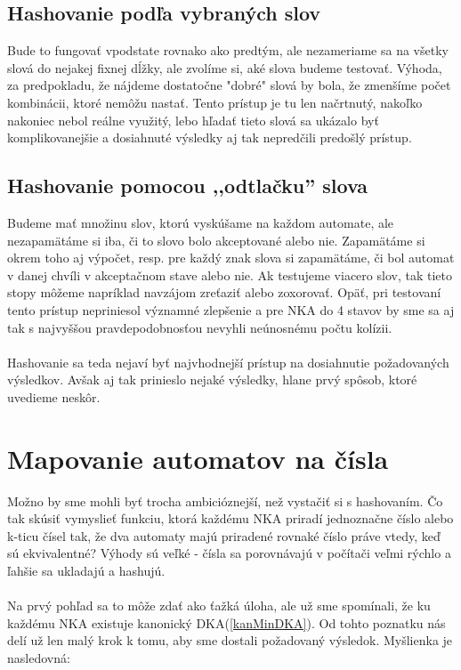\subsection{Hashovanie podľa vybraných slov}
Bude to fungovať vpodstate rovnako ako predtým, ale nezameriame sa na všetky slová do nejakej fixnej dĺžky, ale zvolíme si, aké slova budeme testovať. Výhoda, za predpokladu, že nájdeme dostatočne "dobré" slová by bola, že zmenšíme počet kombinácii, ktoré nemôžu nastať. Tento prístup je tu len načrtnutý, nakoľko nakoniec nebol reálne využitý, lebo hľadať tieto slová sa ukázalo byť komplikovanejšie a dosiahnuté výsledky aj tak nepredčili predošlý prístup.

\subsection{Hashovanie pomocou ,,odtlačku'' slova}
Budeme mať množinu slov, ktorú vyskúšame na každom automate, ale nezapamätáme si iba, či to slovo bolo akceptované alebo nie. Zapamätáme si okrem toho aj výpočet, resp. pre každý znak slova si zapamätáme, či bol automat v danej chvíli v akceptačnom stave alebo nie. Ak testujeme viacero slov, tak tieto stopy môžeme napríklad navzájom zreťaziť alebo zoxorovať. Opäť, pri testovaní tento prístup nepriniesol významné zlepšenie a pre NKA do 4 stavov by sme sa aj tak s najvyššou pravdepodobnosťou nevyhli neúnosnému počtu kolízii.

\paragraph{}
Hashovanie sa teda nejaví byť najvhodnejší prístup na dosiahnutie požadovaných výsledkov. Avšak aj tak prinieslo nejaké výsledky, hlane prvý spôsob, ktoré uvedieme neskôr.

\section{Mapovanie automatov na čísla}

Možno by sme mohli byť trocha ambicióznejší, než vystačiť si s hashovaním. Čo tak skúsiť vymyslieť funkciu, ktorá každému NKA priradí jednoznačne číslo alebo k-ticu čísel tak, že dva automaty majú priradené rovnaké číslo práve vtedy, keď sú ekvivalentné? Výhody sú veľké - čísla sa porovnávajú v počítači veľmi rýchlo a ľahšie sa ukladajú a hashujú. 
\paragraph{}
Na prvý pohľad sa to môže zdať ako ťažká úloha, ale už sme spomínali, že ku každému NKA existuje kanonický DKA(\ref{kanMinDKA}). Od tohto poznatku nás delí už len malý krok k tomu, aby sme dostali požadovaný výsledok. Myšlienka je nasledovná:
